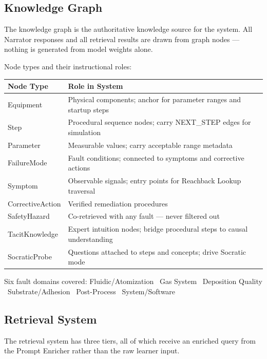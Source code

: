 \documentclass[11pt,letterpaper]{article}
\begin{document}
\subsection{Knowledge Graph}
\label{sec:knowledge-graph}

The knowledge graph is the authoritative knowledge source for the system. All Narrator responses and all retrieval results are drawn from graph nodes --- nothing is generated from model weights alone.

Node types and their instructional roles:

\begin{center}
\begin{tabularx}{\textwidth}{@{}l X@{}}
\toprule
\textbf{Node Type} & \textbf{Role in System} \\
\midrule
Equipment & Physical components; anchor for parameter ranges and startup steps \\
Step & Procedural sequence nodes; carry NEXT\_STEP edges for simulation \\
Parameter & Measurable values; carry acceptable range metadata \\
FailureMode & Fault conditions; connected to symptoms and corrective actions \\
Symptom & Observable signals; entry points for Reachback Lookup traversal \\
CorrectiveAction & Verified remediation procedures \\
SafetyHazard & Co-retrieved with any fault --- never filtered out \\
TacitKnowledge & Expert intuition nodes; bridge procedural steps to causal understanding \\
SocraticProbe & Questions attached to steps and concepts; drive Socratic mode \\
\bottomrule
\end{tabularx}
\end{center}

Six fault domains covered: Fluidic/Atomization \textbullet\ Gas System \textbullet\ Deposition Quality \textbullet\ Substrate/Adhesion \textbullet\ Post-Process \textbullet\ System/Software

\subsection{Retrieval System}
\label{sec:retrieval-system}

The retrieval system has three tiers, all of which receive an enriched query from the Prompt Enricher rather than the raw learner input.
\end{document}
